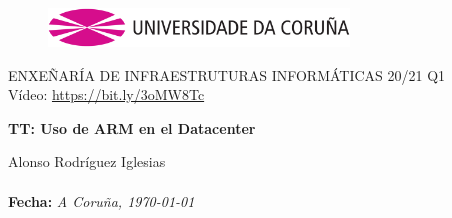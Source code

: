 \documentclass[a4paper,openright,12pt]{article}
\begin{document}
\clearpage

\begin{titlepage}

\begin{center}
\vspace*{-1in}
\vspace{3.5cm}
\begin{figure}[htb]
\begin{center}
\includegraphics[width=8cm]{img/udc.eps}
\end{center}
\end{figure}

\vspace*{1in}
\title {}
ENXEÑARÍA DE INFRAESTRUTURAS INFORMÁTICAS 20/21 Q1\\
Vídeo: \url{https://bit.ly/3oMW8Tc}\\
\vspace*{0.5in}
\begin{Large}
\textbf{TT: Uso de ARM en el Datacenter}\\
\end{Large}

\vspace*{10cm}

\begin{large}
\raggedleft{}
Alonso Rodríguez Iglesias\\

\textbf{\\Fecha:}\emph{ A Coruña, \today}\\
\end{large}

\end{center}
\end{titlepage} 

\newpage


%

\tableofcontents
\end{document}
